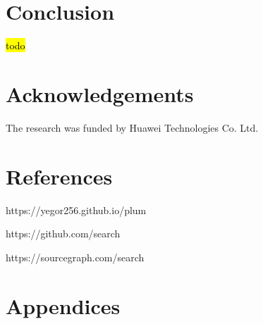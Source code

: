 \documentclass[anonymous,sigplan,review,11pt,nonacm,natbib=false]{acmart}
\begin{document}
    \section{Conclusion}\label{sec:conclusion}

    \hl{todo}

    \section{Acknowledgements}

    The research was funded by Huawei Technologies Co. Ltd.

    \section{References}

    https://yegor256.github.io/plum

    https://github.com/search

    https://sourcegraph.com/search

    \section{Appendices}

    \label{table 1}
\end{document}
